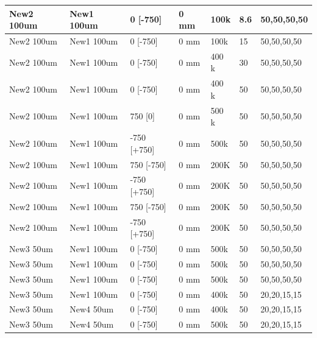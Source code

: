 \begin{refsection}
\begin{table}
\begin{tabular}{|l|l|l|l|l|l|l|}
            New2 100um  & New1 100um  & 0 {[}-750{]}     & 0 mm     & 100k   & 8.6           & 50,50,50,50       \\ \hline
            New2 100um  & New1 100um  & 0 {[}-750{]}     & 0 mm     & 100k   & 15            & 50,50,50,50       \\ \hline
            New2 100um  & New1 100um  & 0 {[}-750{]}     & 0 mm     & 400 k  & 30            & 50,50,50,50       \\ \hline
            New2 100um  & New1 100um  & 0 {[}-750{]}     & 0 mm     & 400 k  & 50            & 50,50,50,50       \\ \hline
            New2 100um  & New1 100um  & 750 {[}0{]}      & 0 mm     & 500 k  & 50            & 50,50,50,50       \\ \hline
            New2 100um  & New1 100um  & -750 {[}+750{]}  & 0 mm     & 500k   & 50            & 50,50,50,50       \\ \hline
            New2 100um  & New1 100um  & 750 {[}-750{]}   & 0 mm     & 200K   & 50            & 50,50,50,50       \\ \hline
            New2 100um  & New1 100um  & -750 {[}+750{]}  & 0 mm     & 200K   & 50            & 50,50,50,50       \\ \hline
            New2 100um  & New1 100um  & 750 {[}-750{]}   & 0 mm     & 200K   & 50            & 50,50,50,50       \\ \hline
            New2 100um  & New1 100um  & -750 {[}+750{]}  & 0 mm     & 200K   & 50            & 50,50,50,50       \\ \hline
            New3 50um   & New1 100um  & 0 {[}-750{]}     & 0 mm     & 500k   & 50            & 50,50,50,50       \\ \hline
            New3 50um   & New1 100um  & 0 {[}-750{]}     & 0 mm     & 500k   & 50            & 50,50,50,50       \\ \hline
            New3 50um   & New1 100um  & 0 {[}-750{]}     & 0 mm     & 500k   & 50            & 50,50,50,50       \\ \hline
            New3 50um   & New1 100um  & 0 {[}-750{]}     & 0 mm     & 400k   & 50            & 20,20,15,15       \\ \hline
            New3 50um   & New4 50um   & 0 {[}-750{]}     & 0 mm     & 400k   & 50            & 20,20,15,15       \\ \hline
            New3 50um   & New4 50um   & 0 {[}-750{]}     & 0 mm     & 500k   & 50            & 20,20,15,15       \\ \hline

\end{tabular}
\end{table}
\end{refsection}
